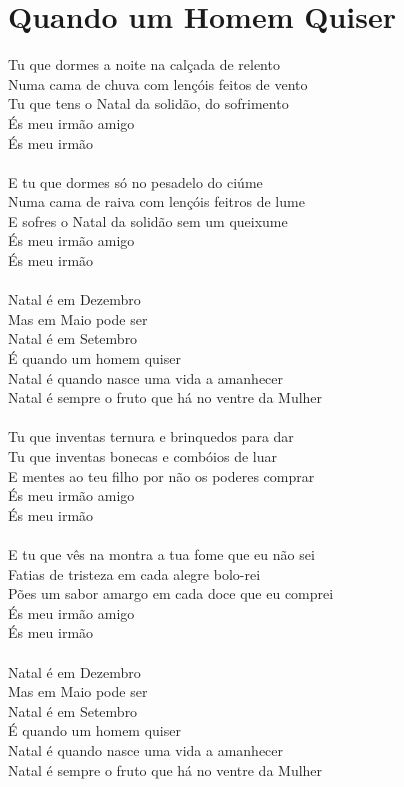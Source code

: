 \documentclass{article}
\begin{document}
\section{ Quando um Homem Quiser}
Tu que dormes a noite na calçada de relento\\
Numa cama de chuva com lençóis feitos de vento\\
Tu que tens o Natal da solidão, do sofrimento\\
És meu irmão amigo\\
És meu irmão\\
 \\
E tu que dormes só no pesadelo do ciúme\\
Numa cama de raiva com lençóis feitros de lume\\
E sofres o Natal da solidão sem um queixume\\
És meu irmão amigo\\
És meu irmão\\
 \\
Natal é em Dezembro\\
Mas em Maio pode ser\\
Natal é em Setembro\\
É quando um homem quiser\\
Natal é quando nasce uma vida a amanhecer\\
Natal é sempre o fruto que há no ventre da Mulher\\
 \\
Tu que inventas ternura e brinquedos para dar\\
Tu que inventas bonecas e combóios de luar\\
E mentes ao teu filho por não os poderes comprar\\
És meu irmão amigo\\
És meu irmão\\
 \\
E tu que vês na montra a tua fome que eu não sei\\
Fatias de tristeza em cada alegre bolo-rei\\
Pões um sabor amargo em cada doce que eu comprei\\
És meu irmão amigo\\
És meu irmão\\
 \\
Natal é em Dezembro\\
Mas em Maio pode ser\\
Natal é em Setembro\\
É quando um homem quiser\\
Natal é quando nasce uma vida a amanhecer\\
Natal é sempre o fruto que há no ventre da Mulher\\
\end{document}
